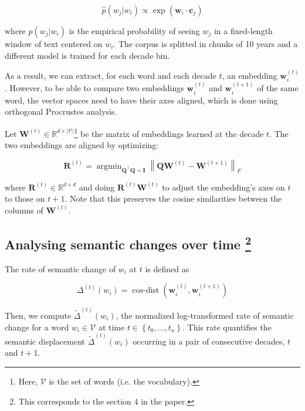 \documentclass[11pt, twocolumn]{extarticle}
\DeclareMathOperator*{\argmin}{argmin}
\newcommand{\word}[1]{w_{#1}}
\newcommand{\embt}[2]{\mathbf{w}^{(#2)}_{#1}}
\begin{document}
\begin{equation}
    \hat{p}\left(w_{j} | w_{i}\right) \propto \exp \left(\mathbf{w}_{i} \cdot \mathbf{c}_{j}\right)
\end{equation}

where $\hat{p}\left(w_{j} | w_{i}\right)$ is the empirical probability of seeing $\word{j}$ in a fixed-length window of text centered on $\word{i}$. The corpus is splitted in chunks of 10 years and a different model is trained for each decade bin. 
\par

As a result, we can extract, for each word and each decade $t$, an embedding $\embt{i}{t}$. However, to be able to compare two embeddings $\embt{i}{t}$ and $\embt{i}{t + 1}$ of the same word, the vector spaces need to have their axes aligned, which is done using orthogonal Procrustes analysis. 
\par

Let $\mathbf{W}^{(t)} \in \mathbb{R}^{d \times|\mathcal{V}|}$\footnote{Here, $\mathcal{V}$ is the set of words (i.e. the vocabulary).} be the matrix of embeddings learned at the decade $t$. The two embeddings are aligned by optimizing:

\begin{equation}
    \mathbf{R}^{(t)}=\argmin _{\mathbf{Q}^{\top} \mathbf{Q}=\mathbf{I}}\left\|\mathbf{Q} \mathbf{W}^{(t)}-\mathbf{W}^{(t+1)}\right\|_{F}
\end{equation}
 
 where $\mathbf{R}^{(t)} \in \mathbb{R}^{d \times d}$ and doing $\mathbf{R}^{(t)} \mathbf{W}^{(t)}$ to adjust the embedding's axes on $t$ to those on $t + 1$. Note that this preserves the cosine similarities between the columns of $\mathbf{W}^{(t)}$.
 
\subsection*{Analysing semantic changes over time \footnote{This corresponds to the section 4 in the paper.}}

The rate of semantic change of $\word{i}$ at $t$ is defined as

\begin{equation}
    \Delta^{(t)}\left(w_{i}\right)=\operatorname{cos-dist}\left(\mathbf{w}_{i}^{(t)}, \mathbf{w}_{i}^{(t+1)}\right)
\end{equation}

Then, we compute \(\tilde{\Delta}^{( t )}(w_{i})\), the normalized log-transformed rate of semantic change  for a word \(w_{i} \in \mathcal{V}\) at time \(t \in \left\{ t_{0},\dots,t_{n} \right\}\). This rate quantifies the semantic displacement \(\tilde{\Delta}^{( t )}(w_i)\) occurring in a pair of consecutive decades, $t$ and $t+1$. 
\par
\end{document}
